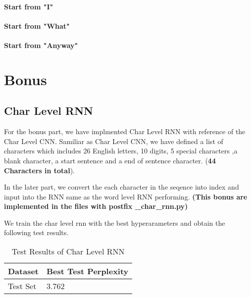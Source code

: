 \documentclass{article}
\begin{document}
\paragraph{Start from "I"}

\paragraph{Start from "What"}

\paragraph{Start from "Anyway"}

\pagebreak

\section{Bonus}

\subsection{Char Level RNN}
For the bonus part, we have implmented Char Level RNN with reference of the Char Level CNN. Samiliar as Char Level CNN, we have defined a list of characters which includes 26 English letters, 10 digits, 5 special characters ,a blank character, a start sentence and a end of sentence character. (\textbf{44 Characters in total}). 

In the later part, we convert the each character in the seqence into index and input into the RNN same as the word level RNN performing.  \textbf{(This bonus are implemented in the files with postfix \_char\_rnn.py)}

We train the char level rnn with the best hyperarameters and obtain the following test results.

\begin{table}[htb]
	\caption{Test Results of Char Level RNN}
	\label{sample-table}
	\centering
	\begin{tabular}{ll}
		\toprule
		\cmidrule{1-2}
		Dataset & Best Test Perplexity\\
		\midrule
		Test Set & 3.762   \\
		\bottomrule
	\end{tabular}
\end{table}
\end{document}
